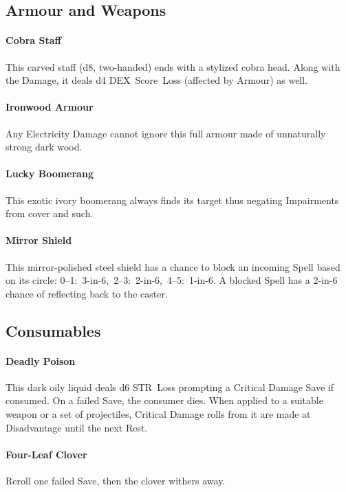\documentclass[itdr]{subfiles}
\begin{document}
\vfill
\break

\subsection*{Armour and Weapons}

\paragraph{Cobra Staff}
This carved staff (d8, two-handed) ends with a stylized cobra head. Along with the Damage, it deals d4 DEX~Score~Loss (affected by Armour) as well.

\paragraph{Ironwood Armour}
Any Electricity Damage cannot ignore this full \mbox{armour} made of unnaturally strong dark wood.

\paragraph{Lucky Boomerang}
This exotic ivory boomerang always finds its target thus negating Impairments from cover and such.

\paragraph{Mirror Shield}
This mirror-polished steel shield has a chance to block an incoming Spell based on its circle: \mbox{0--1: 3-in-6, 2--3: 2-in-6, 4--5: 1-in-6}. A blocked Spell has a 2-in-6 chance of reflecting back to the caster.

\vfill

\subsection*{Consumables}

\paragraph{Deadly Poison}
This dark oily liquid deals d6 STR~Loss prompting a Critical Damage Save if consumed. On a failed Save, the consumer dies. When applied to a suitable weapon or a set of projectiles, Critical Damage rolls from it are made at Disadvantage until the next Rest.

\paragraph{Four-Leaf Clover}
Reroll one failed Save, then the clover withers away.
\end{document}
